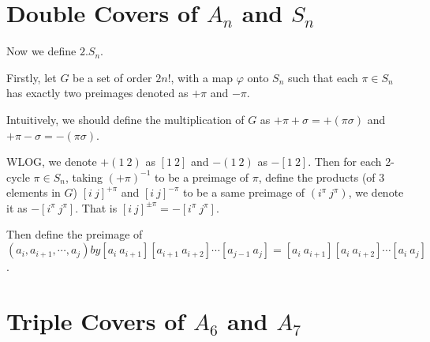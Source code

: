 \documentclass[a4paper,11pt]{article}
\def\subtitle#1{\section{#1}}
\begin{document}
\subtitle{Double Covers of $A_n$ and $S_n$}

Now we define $2.S_n$.

Firstly, let $G$ be a set of order $2n!$, with a map $\varphi$ onto $S_n$ such that each $\pi\in S_n$ has exactly two preimages denoted as $+\pi$ and $-\pi$. 

Intuitively, we should define the multiplication of $G$ as $+\pi+\sigma=+(\pi\sigma)$ and $+\pi-\sigma=-(\pi\sigma)$. 

WLOG, we denote $+(1\ 2)$ as $[1\ 2]$ and $-(1\ 2)$ as $-[1\ 2]$. Then for each 2-cycle $\pi\in S_n$, taking $(+\pi)^{-1}$ to be a preimage of $\pi$, define the products (of 3 elements in $G$) $[i\ j]^{+\pi}$ and $[i\ j]^{-\pi}$ to be a same preimage of $(i^\pi\ j^\pi)$, we denote it as $-[i^\pi\ j^\pi]$. That is $[i\ j]^{\pm\pi}=-[i^\pi\ j^\pi]$. 

Then define the preimage of $(a_i, a_{i+1},\cdots, a_j) by [a_i\ a_{i+1}][a_{i+1}\ a_{i+2}]\cdots[a_{j-1}\ a_j]=[a_i\ a_{i+1}][a_i\ a_{i+2}]\cdots[a_i\ a_j]$.




\subtitle{Triple Covers of $A_6$ and $A_7$}




\ifx\ChapTwoSecSeven\undefined %
     
\end{document}

